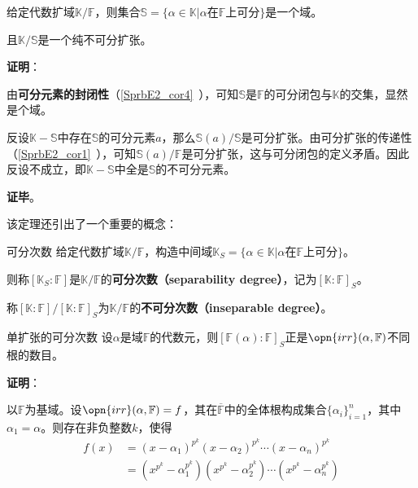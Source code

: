 \begin{theorem}{}\label{PInsEx_the3}
给定代数扩域$\mathbb{K}/\mathbb{F}$，则集合$\mathbb{S}=\{\alpha\in\mathbb{K}|\alpha\text{在}\mathbb{F}\text{上可分}\}$是一个域。

且$\mathbb{K}/\mathbb{S}$是一个纯不可分扩张。
\end{theorem}

\textbf{证明}：

由\textbf{可分元素的封闭性}（\autoref{SprbE2_cor4}~），可知$\mathbb{S}$是$\mathbb{F}$的可分闭包与$\mathbb{K}$的交集，显然是个域。

反设$\mathbb{K}-\mathbb{S}$中存在$\mathbb{S}$的可分元素$a$，那么$\mathbb{S}(a)/\mathbb{S}$是可分扩张。由可分扩张的传递性（\autoref{SprbE2_cor1}~），可知$\mathbb{S}(a)/\mathbb{F}$是可分扩张，这与可分闭包的定义矛盾。因此反设不成立，即$\mathbb{K}-\mathbb{S}$中全是$\mathbb{S}$的不可分元素。

\textbf{证毕}。

该定理还引出了一个重要的概念：

\begin{definition}{可分次数}
给定代数扩域$\mathbb{K}/\mathbb{F}$，构造中间域$\mathbb{K}_S=\{\alpha\in\mathbb{K}|\alpha\text{在}\mathbb{F}\text{上可分}\}$。

则称$[\mathbb{K}_S:\mathbb{F}]$是$\mathbb{K}/\mathbb{F}$的\textbf{可分次数（separability degree）}，记为$[\mathbb{K}:\mathbb{F}]_S$。

称$[\mathbb{K}:\mathbb{F}] / [\mathbb{K}:\mathbb{F}]_S$为$\mathbb{K}/\mathbb{F}$的\textbf{不可分次数（inseparable degree）}。
\end{definition}


\begin{theorem}{单扩张的可分次数}\label{PInsEx_the4}
设$\alpha$是域$\mathbb{F}$的代数元，则$[\mathbb{F}(\alpha):\mathbb{F}]_S$正是$\opn{irr}(\alpha, \mathbb{F})$不同根的数目。
\end{theorem}

\textbf{证明}：

以$\mathbb{F}$为基域。设$\opn{irr}(\alpha, \mathbb{F})=f$，其在$\overline{\mathbb{F}}$中的全体根构成集合$\{\alpha_i\}_{i=1}^n$，其中$\alpha_1=\alpha$。则存在非负整数$k$，使得
\begin{equation}
\begin{aligned}
f(x) &= (x-\alpha_1)^{p^k}(x-\alpha_2)^{p^k}\cdots(x-\alpha_n)^{p^k}\\
&=(x^{p^k}-\alpha^{p^k}_1)(x^{p^k}-\alpha^{p^k}_2)\cdots(x^{p^k}-\alpha^{p^k}_n)
\end{aligned}
\end{equation}

